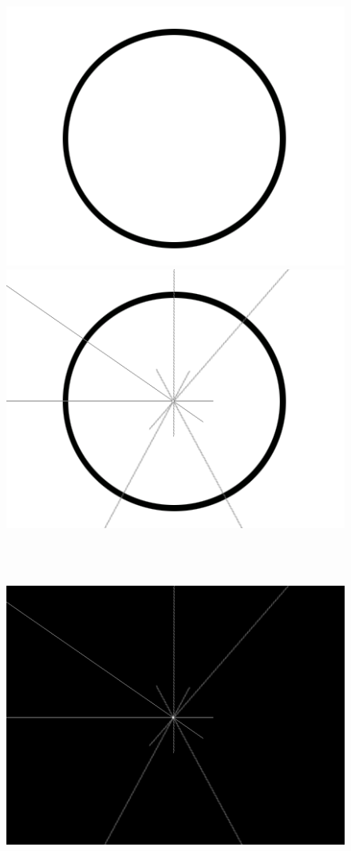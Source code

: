 \begin{figure}[H]
	\begin{minipage}[b]{0.5\linewidth}
		\centering
		\includegraphics[scale=1.5]{files/premethod/img/dirmap1.png}
	\end{minipage}
	\hspace{0.5cm}
	\begin{minipage}[b]{0.5\linewidth}
		\centering
		\includegraphics[scale=1.5]{files/premethod/img/dirmap2.png}
	\end{minipage}\\\\
	\begin{minipage}[b]{0.5\linewidth}
		\centering
		\includegraphics[scale=1.5]{files/premethod/img/dirmap3.png}

\end{minipage}
\end{figure}
